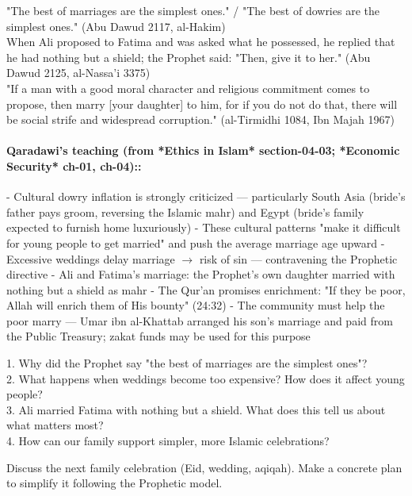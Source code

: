 \documentclass[11pt,a4paper]{article}
\begin{document}
\begin{hadithbox} "The best of marriages are the simplest ones." / "The best of dowries are the simplest ones." (Abu Dawud 2117, al-Hakim) \\ When Ali proposed to Fatima and was asked what he possessed, he replied that he had nothing but a shield; the Prophet said: "Then, give it to her." (Abu Dawud 2125, al-Nassa'i 3375) \\ "If a man with a good moral character and religious commitment comes to propose, then marry [your daughter] to him, for if you do not do that, there will be social strife and widespread corruption." (al-Tirmidhi 1084, Ibn Majah 1967) \end{hadithbox}

\paragraph*{Qaradawi's teaching (from *Ethics in Islam* section-04-03; *Economic Security* ch-01, ch-04)::}  - Cultural dowry inflation is strongly criticized --- particularly South Asia (bride's father pays groom, reversing the Islamic mahr) and Egypt (bride's family expected to furnish home luxuriously) - These cultural patterns "make it difficult for young people to get married" and push the average marriage age upward - Excessive weddings delay marriage \ensuremath{\rightarrow} risk of sin --- contravening the Prophetic directive - Ali and Fatima's marriage: the Prophet's own daughter married with nothing but a shield as mahr - The Qur'an promises enrichment: "If they be poor, Allah will enrich them of His bounty" (24:32) - The community must help the poor marry --- Umar ibn al-Khattab arranged his son's marriage and paid from the Public Treasury; zakat funds may be used for this purpose

\begin{discussionbox} 1. Why did the Prophet say "the best of marriages are the simplest ones"? \\ 2. What happens when weddings become too expensive? How does it affect young people? \\ 3. Ali married Fatima with nothing but a shield. What does this tell us about what matters most? \\ 4. How can our family support simpler, more Islamic celebrations? \end{discussionbox}

\begin{activitybox} Discuss the next family celebration (Eid, wedding, aqiqah). Make a concrete plan to simplify it following the Prophetic model. \end{activitybox}
\end{document}
